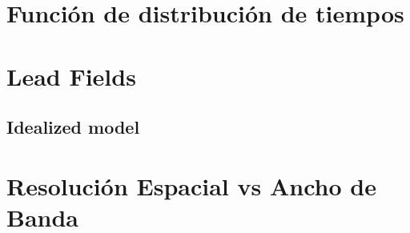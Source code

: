 \section{Función de distribución de tiempos}

\section{Lead Fields}

\subsection{Idealized model}

%
%
%
%
%
%
\section{Resolución Espacial vs Ancho de Banda}

